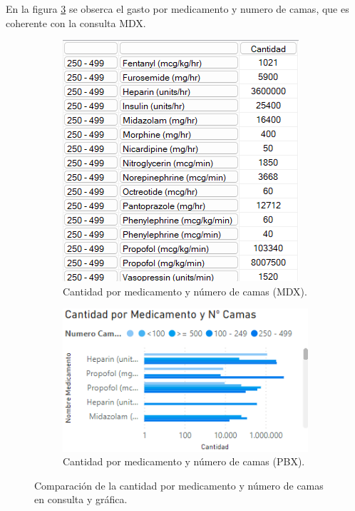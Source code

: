 \documentclass{article}
\begin{document}
En la figura \ref{fig:medicamento_camas_comparacion} se obserca el gasto por medicamento y numero de camas, que es coherente con la consulta MDX.
\begin{figure}[H]
	\centering
	\begin{subfigure}[b]{0.4\textwidth}
		\centering
		\includegraphics[width=\textwidth]{images/cantidad_medicamento_numero_camas_mdx.png}
		\caption{Cantidad por medicamento y número de camas (MDX).}
		\label{fig:medicamento_camas_mdx}
	\end{subfigure}
	\hfill
	\begin{subfigure}[b]{0.4\textwidth}
		\centering
		\includegraphics[width=\textwidth]{images/cantidad_medicamento_numero_camas_pbx.png}
		\caption{Cantidad por medicamento y número de camas (PBX).}
		\label{fig:medicamento_camas_pbx}
	\end{subfigure}
	\caption{Comparación de la cantidad por medicamento y número de camas en consulta y gráfica.}
	\label{fig:medicamento_camas_comparacion}
\end{figure}
\end{document}
